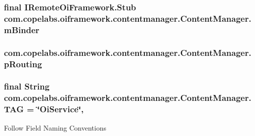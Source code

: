 \subsubsection[{m\+Binder}]{\setlength{\rightskip}{0pt plus 5cm}final I\+Remote\+Oi\+Framework.\+Stub com.\+copelabs.\+oiframework.\+contentmanager.\+Content\+Manager.\+m\+Binder\hspace{0.3cm}{\ttfamily [private]}}\label{classcom_1_1copelabs_1_1oiframework_1_1contentmanager_1_1_content_manager_a530fa8b90c4758fdbad5f0973ea488e8}
\hypertarget{classcom_1_1copelabs_1_1oiframework_1_1contentmanager_1_1_content_manager_a15b9d671e7079dd1c471a4b6a331f3e8}{}
\subsubsection[{p\+Routing}]{ com.\+copelabs.\+oiframework.\+contentmanager.\+Content\+Manager.\+p\+Routing\hspace{0.3cm}{\ttfamily [private]}}\label{classcom_1_1copelabs_1_1oiframework_1_1contentmanager_1_1_content_manager_a15b9d671e7079dd1c471a4b6a331f3e8}
\hypertarget{classcom_1_1copelabs_1_1oiframework_1_1contentmanager_1_1_content_manager_a5768346882b7f03d78b3e2e09ff482fa}{}
\subsubsection[{T\+A\+G}]{\setlength{\rightskip}{0pt plus 5cm}final String com.\+copelabs.\+oiframework.\+contentmanager.\+Content\+Manager.\+T\+A\+G = \char`\"{}Oi\+Service\char`\"{}\hspace{0.3cm}{\ttfamily [static]}, {\ttfamily [private]}}\label{classcom_1_1copelabs_1_1oiframework_1_1contentmanager_1_1_content_manager_a5768346882b7f03d78b3e2e09ff482fa}
Follow Field Naming Conventions


